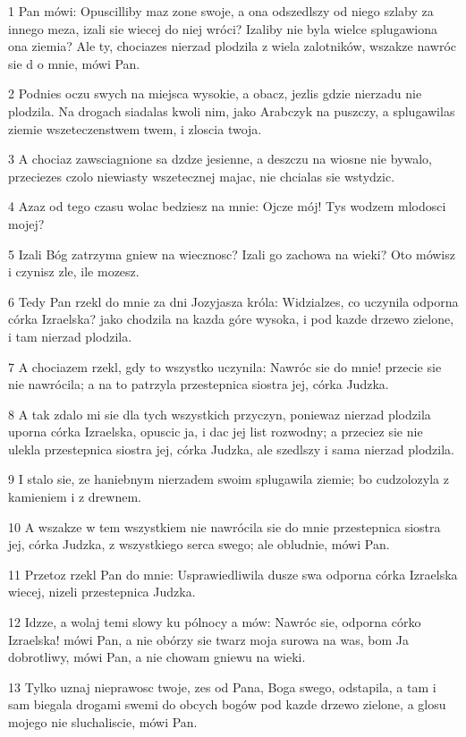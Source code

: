 \par 1 Pan mówi: Opuscilliby maz zone swoje, a ona odszedlszy od niego szlaby za innego meza, izali sie wiecej do niej wróci? Izaliby nie byla wielce splugawiona ona ziemia? Ale ty, chociazes nierzad plodzila z wiela zalotników, wszakze nawróc sie d o mnie, mówi Pan.
\par 2 Podnies oczu swych na miejsca wysokie, a obacz, jezlis gdzie nierzadu nie plodzila. Na drogach siadalas kwoli nim, jako Arabczyk na puszczy, a splugawilas ziemie wszeteczenstwem twem, i zloscia twoja.
\par 3 A chociaz zawsciagnione sa dzdze jesienne, a deszczu na wiosne nie bywalo, przeciezes czolo niewiasty wszetecznej majac, nie chcialas sie wstydzic.
\par 4 Azaz od tego czasu wolac bedziesz na mnie: Ojcze mój! Tys wodzem mlodosci mojej?
\par 5 Izali Bóg zatrzyma gniew na wiecznosc? Izali go zachowa na wieki? Oto mówisz i czynisz zle, ile mozesz.
\par 6 Tedy Pan rzekl do mnie za dni Jozyjasza króla: Widzialzes, co uczynila odporna córka Izraelska? jako chodzila na kazda góre wysoka, i pod kazde drzewo zielone, i tam nierzad plodzila.
\par 7 A chociazem rzekl, gdy to wszystko uczynila: Nawróc sie do mnie! przecie sie nie nawrócila; a na to patrzyla przestepnica siostra jej, córka Judzka.
\par 8 A tak zdalo mi sie dla tych wszystkich przyczyn, poniewaz nierzad plodzila uporna córka Izraelska, opuscic ja, i dac jej list rozwodny; a przeciez sie nie ulekla przestepnica siostra jej, córka Judzka, ale szedlszy i sama nierzad plodzila.
\par 9 I stalo sie, ze haniebnym nierzadem swoim splugawila ziemie; bo cudzolozyla z kamieniem i z drewnem.
\par 10 A wszakze w tem wszystkiem nie nawrócila sie do mnie przestepnica siostra jej, córka Judzka, z wszystkiego serca swego; ale obludnie, mówi Pan.
\par 11 Przetoz rzekl Pan do mnie: Usprawiedliwila dusze swa odporna córka Izraelska wiecej, nizeli przestepnica Judzka.
\par 12 Idzze, a wolaj temi slowy ku pólnocy a mów: Nawróc sie, odporna córko Izraelska! mówi Pan, a nie obórzy sie twarz moja surowa na was, bom Ja dobrotliwy, mówi Pan, a nie chowam gniewu na wieki.
\par 13 Tylko uznaj nieprawosc twoje, zes od Pana, Boga swego, odstapila, a tam i sam biegala drogami swemi do obcych bogów pod kazde drzewo zielone, a glosu mojego nie sluchaliscie, mówi Pan.

